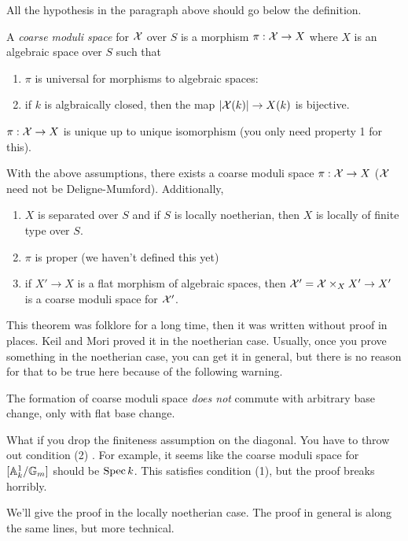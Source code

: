 All the hypothesis in the paragraph above should go below the
definition.
\begin{definition}
  A \emph{coarse moduli space} for $\mathcal{X}$ over $S$ is a morphism
$\pi:\mathcal{X}\to X$ where $X$ is an algebraic space over $S$ such that
  \begin{enumerate}
   \item $\pi$ is universal for morphisms to algebraic spaces:
   \item if $k$ is algbraically closed, then the map $|\mathcal{X}(k)|\to
X(k)$ is bijective.\qedhere
  \end{enumerate}
\end{definition}
\begin{remark}
  $\pi:\mathcal{X}\to X$ is unique up to unique isomorphism (you only need
property 1 for this).
\end{remark}
\begin{theorem}
  With the above assumptions, there exists a coarse moduli space
$\pi:\mathcal{X}\to X$ ($\mathcal{X}$ need not be Deligne-Mumford). Additionally,
  \begin{enumerate}
   \item $X$ is separated over $S$ and if $S$ is locally noetherian,
then $X$ is locally of finite type over $S$.
   \item $\pi$ is proper (we haven't defined this yet)
   \item if $X'\to X$ is a flat morphism of algebraic spaces, then
$\mathcal{X}'=\mathcal{X}\times_X X'\to X'$ is a coarse moduli space for $\mathcal{X}'$.
  \end{enumerate}
\end{theorem}
This theorem was folklore for a long time, then it was written
without proof in places. Keil and Mori proved it in the noetherian
case. Usually, once you prove something in the noetherian case, you
can get it in general, but there is no reason for that to be true
here because of the following warning.
\begin{warning}
  The formation of coarse moduli space \emph{does not} commute with
arbitrary base change, only with flat base change.
\end{warning}
What if you drop the finiteness assumption on the diagonal. You have
to throw out condition (2) . For example, it
seems like the coarse moduli space for $[\mathbb{A}^1_k/\mathbb{G}_m]$ should be
$\operatorname{Spec} k$. This satisfies condition (1), but the proof breaks
horribly.

We'll give the proof in the locally noetherian case. The proof in
general is along the same lines, but more technical.

